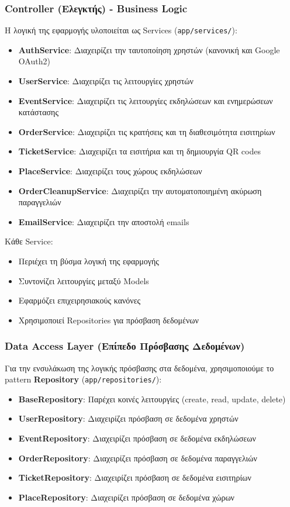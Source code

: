 \documentclass[12pt,a4paper]{report}
\begin{document}
\subsubsection{Controller (Ελεγκτής) - Business Logic}

Η λογική της εφαρμογής υλοποιείται ως Services (\texttt{app/services/}):

\begin{itemize}
    \item \textbf{AuthService}: Διαχειρίζει την ταυτοποίηση χρηστών (κανονική και Google OAuth2)
    \item \textbf{UserService}: Διαχειρίζει τις λειτουργίες χρηστών
    \item \textbf{EventService}: Διαχειρίζει τις λειτουργίες εκδηλώσεων και ενημερώσεων κατάστασης
    \item \textbf{OrderService}: Διαχειρίζει τις κρατήσεις και τη διαθεσιμότητα εισιτηρίων
    \item \textbf{TicketService}: Διαχειρίζει τα εισιτήρια και τη δημιουργία QR codes
    \item \textbf{PlaceService}: Διαχειρίζει τους χώρους εκδηλώσεων
    \item \textbf{OrderCleanupService}: Διαχειρίζει την αυτοματοποιημένη ακύρωση παραγγελιών
    \item \textbf{EmailService}: Διαχειρίζει την αποστολή emails
\end{itemize}

Κάθε Service:
\begin{itemize}
    \item Περιέχει τη βύσμα λογική της εφαρμογής
    \item Συντονίζει λειτουργίες μεταξύ Models
    \item Εφαρμόζει επιχειρησιακούς κανόνες
    \item Χρησιμοποιεί Repositories για πρόσβαση δεδομένων
\end{itemize}

\subsubsection{Data Access Layer (Επίπεδο Πρόσβασης Δεδομένων)}

Για την ενσυλάκωση της λογικής πρόσβασης στα δεδομένα, χρησιμοποιούμε το pattern \textbf{Repository} (\texttt{app/repositories/}):

\begin{itemize}
    \item \textbf{BaseRepository}: Παρέχει κοινές λειτουργίες (create, read, update, delete)
    \item \textbf{UserRepository}: Διαχειρίζει πρόσβαση σε δεδομένα χρηστών
    \item \textbf{EventRepository}: Διαχειρίζει πρόσβαση σε δεδομένα εκδηλώσεων
    \item \textbf{OrderRepository}: Διαχειρίζει πρόσβαση σε δεδομένα παραγγελιών
    \item \textbf{TicketRepository}: Διαχειρίζει πρόσβαση σε δεδομένα εισιτηρίων
    \item \textbf{PlaceRepository}: Διαχειρίζει πρόσβαση σε δεδομένα χώρων
\end{itemize}
\end{document}
